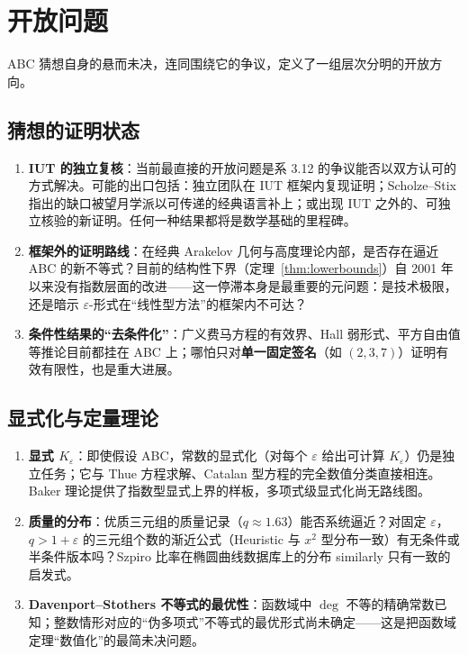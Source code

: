 \section{开放问题}\label{sec:open_problems}

ABC 猜想自身的悬而未决，连同围绕它的争议，定义了一组层次分明的开放方向。

\subsection{猜想的证明状态}

\begin{enumerate}[label=(\arabic*)]
    \item \textbf{IUT 的独立复核}：当前最直接的开放问题是系 3.12 的争议能否以双方认可的方式解决。可能的出口包括：独立团队在 IUT 框架内复现证明；Scholze--Stix 指出的缺口被望月学派以可传递的经典语言补上；或出现 IUT 之外的、可独立核验的新证明。任何一种结果都将是数学基础的里程碑。
    \item \textbf{框架外的证明路线}：在经典 Arakelov 几何与高度理论内部，是否存在逼近 ABC 的新不等式？目前的结构性下界（定理~\ref{thm:lowerbounds}）自 2001 年以来没有指数层面的改进——这一停滞本身是最重要的元问题：是技术极限，还是暗示 $\varepsilon$-形式在“线性型方法”的框架内不可达？
    \item \textbf{条件性结果的“去条件化”}：广义费马方程的有效界、Hall 弱形式、平方自由值等推论目前都挂在 ABC 上；哪怕只对\textbf{单一固定签名}（如 $(2,3,7)$）证明有效有限性，也是重大进展。
\end{enumerate}

\subsection{显式化与定量理论}

\begin{enumerate}[label=(\arabic*)]
    \item \textbf{显式 $K_\varepsilon$}：即使假设 ABC，常数的显式化（对每个 $\varepsilon$ 给出可计算 $K_\varepsilon$）仍是独立任务；它与 Thue 方程求解、Catalan 型方程的完全数值分类直接相连。Baker 理论提供了指数型显式上界的样板，多项式级显式化尚无路线图。
    \item \textbf{质量的分布}：优质三元组的质量记录（$q \approx 1.63$）能否系统逼近？对固定 $\varepsilon$，$q > 1 + \varepsilon$ 的三元组个数的渐近公式（Heuristic 与 $x^2$ 型分布一致）有无条件或半条件版本吗？Szpiro 比率在椭圆曲线数据库上的分布 similarly 只有一致的启发式。
    \item \textbf{Davenport--Stothers 不等式的最优性}：函数域中 $\deg$ 不等的精确常数已知；整数情形对应的“伪多项式”不等式的最优形式尚未确定——这是把函数域定理“数值化”的最简未决问题。
\end{enumerate}

